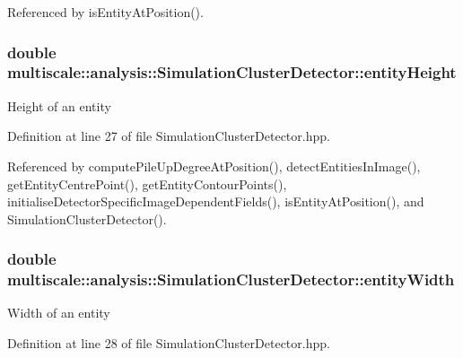 Referenced by is\-Entity\-At\-Position().

\hypertarget{classmultiscale_1_1analysis_1_1SimulationClusterDetector_a2ba5c2738d32f71ccaacba4129b7bcfc}{
\subsubsection[{entity\-Height}]{\setlength{\rightskip}{0pt plus 5cm}double multiscale\-::analysis\-::\-Simulation\-Cluster\-Detector\-::entity\-Height\hspace{0.3cm}{\ttfamily [private]}}}\label{classmultiscale_1_1analysis_1_1SimulationClusterDetector_a2ba5c2738d32f71ccaacba4129b7bcfc}
Height of an entity 

Definition at line 27 of file Simulation\-Cluster\-Detector.\-hpp.



Referenced by compute\-Pile\-Up\-Degree\-At\-Position(), detect\-Entities\-In\-Image(), get\-Entity\-Centre\-Point(), get\-Entity\-Contour\-Points(), initialise\-Detector\-Specific\-Image\-Dependent\-Fields(), is\-Entity\-At\-Position(), and Simulation\-Cluster\-Detector().

\hypertarget{classmultiscale_1_1analysis_1_1SimulationClusterDetector_a9212da88b787b8f9791f27d913b6d05d}{
\subsubsection[{entity\-Width}]{\setlength{\rightskip}{0pt plus 5cm}double multiscale\-::analysis\-::\-Simulation\-Cluster\-Detector\-::entity\-Width\hspace{0.3cm}{\ttfamily [private]}}}\label{classmultiscale_1_1analysis_1_1SimulationClusterDetector_a9212da88b787b8f9791f27d913b6d05d}
Width of an entity 

Definition at line 28 of file Simulation\-Cluster\-Detector.\-hpp.



